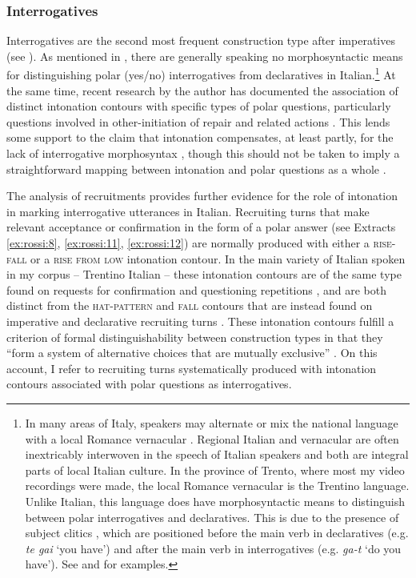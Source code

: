 \documentclass[output=paper,modfonts]{langscibook}
\begin{document}
\subsubsection{Interrogatives}\label{sec:rossi:3.3.3}
Interrogatives are the second most frequent construction type after imperatives (see ). As mentioned in , there are generally speaking no morphosyntactic means for distinguishing polar (yes/no) interrogatives from declaratives in Italian.\footnote{In many areas of Italy, speakers may alternate or mix the national language with a local Romance vernacular \citep{MaidenParry1997}. Regional Italian and vernacular are often inextricably interwoven in the speech of Italian speakers and both are integral parts of local Italian culture. In the province of Trento, where most my video recordings were made, the local Romance vernacular is the Trentino language. Unlike Italian, this language does have morphosyntactic means to distinguish between polar interrogatives and declaratives. This is due to the presence of subject clitics \citep{Lusini2013}, which are positioned before the main verb in declaratives (e.g. \textit{te gai} ‘you have’) and after the main verb in interrogatives (e.g. \textit{ga-t} ‘do you have’). See   and  for examples.} At the same time, recent research by the author has documented the association of distinct intonation contours with specific types of polar questions, particularly questions involved in other-initiation of repair and related actions \citep{Rossi2015c,Rossi2020b}. This lends some support to the claim that intonation compensates, at least partly, for the lack of interrogative morphosyntax \citep[e.g.][]{GiliFivelaEtAl2015}, though this should not be taken to imply a straightforward mapping between intonation and polar questions as a whole \citep{Rossano2010}. %

The analysis of recruitments provides further evidence for the role of intonation in marking interrogative utterances in Italian. Recruiting turns that make relevant acceptance or confirmation in the form of a polar answer (see Extracts \ref{ex:rossi:8}, \ref{ex:rossi:11}, \ref{ex:rossi:12}) are normally produced with either a \textsc{rise-fall} or a \textsc{rise from low} intonation contour. In the main variety of Italian spoken in my corpus -- Trentino Italian -- these intonation contours are of the same type found on requests for confirmation and questioning repetitions \citep{Rossi2015c,Rossi2020b}, and are both distinct from the \textsc{hat-pattern} and \textsc{fall} contours that are instead found on imperative and declarative recruiting turns \citep{Rossi2011}. These intonation contours fulfill a criterion of formal distinguishability between construction types in that they “form a system of alternative choices that are mutually exclusive” \citep[278]{KönigSiemund2007}. On this account, I refer to recruiting turns systematically produced with intonation contours associated with polar questions as interrogatives.
\end{document}
